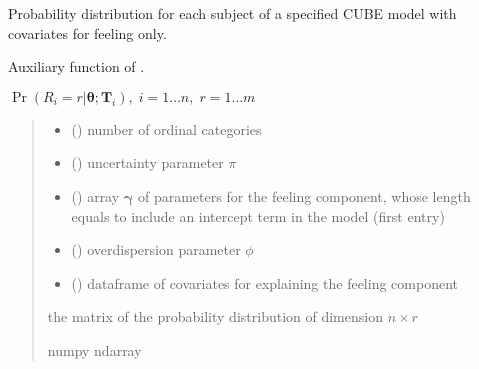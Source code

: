 \documentclass[letterpaper,10pt,english]{sphinxmanual}
\begin{document}

\begin{fulllineitems}
\label{\detokenize{cubmods:cubmods.cube_0w0.pmfi}}
\pysigstartsignatures
{}
\pysigstopsignatures
\sphinxAtStartPar
Probability distribution for each subject of a specified CUBE model 
with covariates for feeling only.

\sphinxAtStartPar
Auxiliary function of .

\sphinxAtStartPar
\(\Pr(R_i=r|\pmb\theta; \pmb T_i),\; i=1 \ldots n ,\; r=1 \ldots m\)
\begin{quote}\begin{description}
\begin{itemize}
\item {} 
\sphinxAtStartPar
{} () \textendash{} number of ordinal categories

\item {} 
\sphinxAtStartPar
{} () \textendash{} uncertainty parameter \(\pi\)

\item {} 
\sphinxAtStartPar
{} () \textendash{} array \(\pmb \gamma\) of parameters for the feeling component, whose length equals 
 to include an intercept term in the model (first entry)

\item {} 
\sphinxAtStartPar
{} () \textendash{} overdispersion parameter \(\phi\)

\item {} 
\sphinxAtStartPar
{} () \textendash{} dataframe of covariates for explaining the feeling component

\end{itemize}

\sphinxAtStartPar
the matrix of the probability distribution of dimension \(n \times r\)

\sphinxAtStartPar
numpy ndarray

\end{description}\end{quote}

\end{fulllineitems}
\end{document}
